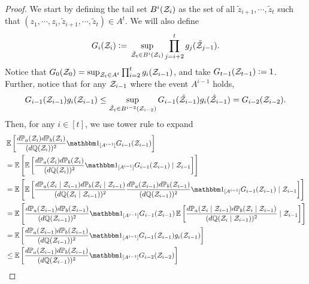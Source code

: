 \begin{proof}
    We start by defining the tail set \(B^i({\mathcal Z}_i)\) as the set of all \(\tilde z_{i+1},\cdots, \tilde z_t\) such that \((z_1,\cdots,z_i,\tilde z_{i+1},\cdots,\tilde z_t) \in A^t\).
    We will also define
    \[
        G_i({\mathcal Z}_{i}) \;{\vcentcolon=}\; \sup_{\tilde{{\mathcal Z}}_t\in B^i({\mathcal Z}_i)} \prod_{j=i+2}^t g_{j}(\tilde{{\mathcal Z}}_{j-1}).
    \]
    Notice that \(G_0({\mathcal Z}_0) = \sup_{{\mathcal Z}_t\in A^t} \prod_{i=2}^t g_i({\mathcal Z}_{i-1})\), and take \(G_{t-1}({\mathcal Z}_{t-1}) \;{\vcentcolon=}\; 1\).
    Further, notice that for any \({\mathcal Z}_{i-1}\) where the event \(A^{i-1}\) holds,
    \begin{align*}
        G_{i-1}({\mathcal Z}_{i-1}) g_i({\mathcal Z}_{i-1})
        \leq \sup_{\tilde{{\mathcal Z}}_t\in B^{i-2}({\mathcal Z}_{i-2})} G_{i-1}(\tilde{{\mathcal Z}}_{i-1}) g_i(\tilde{{\mathcal Z}}_{i-1})
        = G_{i-2}({\mathcal Z}_{i-2}).
    \end{align*}
    Then, for any \(i\in[t]\), we use tower rule to expand
    \begin{align*}
        &\E\left[
            \frac{d\bbP_a(\cZ_i) d\bbP_b(\cZ_i)}{(d\bbQ(\cZ_i))^2}
            \mathbbm1_{[A^{i-1}]}
            G_{i-1}(\cZ_{i-1})
        \right] \\
        &= \E\left[ \E\left[
            \frac{d\bbP_a(\cZ_i) d\bbP_b(\cZ_i)}{(d\bbQ(\cZ_i))^2}
            \mathbbm1_{[A^{i-1}]}
            G_{i-1}(\cZ_{i-1})
        \mid \cZ_{i-1} \right]\right] \\
        &= \E\left[ \E\left[
            \frac{d\bbP_a(\cZ_i \mid \cZ_{i-1}) d\bbP_b(\cZ_i \mid \cZ_{i-1})}{(d\bbQ(\cZ_i \mid \cZ_{i-1}))^2}
            \frac{d\bbP_a(\cZ_{i-1}) d\bbP_b(\cZ_{i-1})}{(d\bbQ(\cZ_{i-1}))^2}
            \mathbbm1_{[A^{i-1}]}
            G_{i-1}(\cZ_{i-1})
        \mid \cZ_{i-1} \right]\right] \\
        &= \E\left[
            \frac{d\bbP_a(\cZ_{i-1}) d\bbP_b(\cZ_{i-1})}{(d\bbQ(\cZ_{i-1}))^2}
            \mathbbm1_{[A^{i-1}]}
            G_{i-1}(\cZ_{i-1})
            \E\left[
            \frac{d\bbP_a(\cZ_i \mid \cZ_{i-1}) d\bbP_b(\cZ_i \mid \cZ_{i-1})}{(d\bbQ(\cZ_i \mid \cZ_{i-1}))^2}
        \mid \cZ_{i-1} \right]\right] \\
        &= \E\left[
            \frac{d\bbP_a(\cZ_{i-1}) d\bbP_b(\cZ_{i-1})}{(d\bbQ(\cZ_{i-1}))^2}
            \mathbbm1_{[A^{i-1}]}
            G_{i-1}(\cZ_{i-1})
            g_i(\cZ_{i-1}) \right] \\
        &\leq \E\left[
            \frac{d\bbP_a(\cZ_{i-1}) d\bbP_b(\cZ_{i-1})}{(d\bbQ(\cZ_{i-1}))^2}
            \mathbbm1_{[A^{i-1}]}
            G_{i-2}(\cZ_{i-2})\right] \\

\end{align*}
\end{proof}
